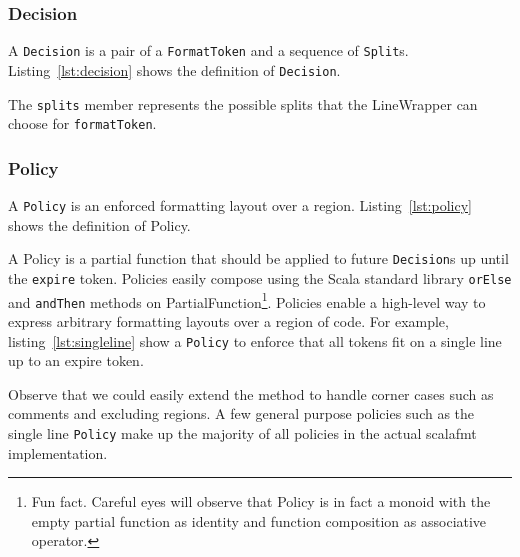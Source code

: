 \subsubsection{Decision}\label{sec:decision}
A \texttt{Decision} is a pair of a \texttt{FormatToken} and a sequence of \texttt{Split}s.
Listing~\ref{lst:decision} shows the definition of \texttt{Decision}.

The \texttt{splits} member represents the possible splits that the LineWrapper can choose for \texttt{formatToken}.

\subsubsection{Policy}\label{sec:policy}
A \texttt{Policy} is an enforced formatting layout over a region.
Listing~\ref{lst:policy} shows the definition of Policy.
\begin{minipage}{\linewidth}
  
\end{minipage}
A Policy is a partial function that should be applied to future \texttt{Decision}s up until the \texttt{expire} token.
Policies easily compose using the Scala standard library \texttt{orElse} and \texttt{andThen} methods on PartialFunction\footnote{
  Fun fact. Careful eyes will observe that Policy is in fact a monoid with the empty partial function as identity and function composition as associative operator.}.
Policies enable a high-level way to express arbitrary formatting layouts over a region of code.
For example, listing~\ref{lst:singleline} show a \texttt{Policy} to enforce that all tokens fit on a single line up to an expire token.
\begin{minipage}{\linewidth}
  
\end{minipage}
Observe that we could easily extend the method to handle corner cases such as comments and excluding regions.
A few general purpose policies such as the single line \texttt{Policy} make up the majority of all policies in the actual scalafmt implementation.

